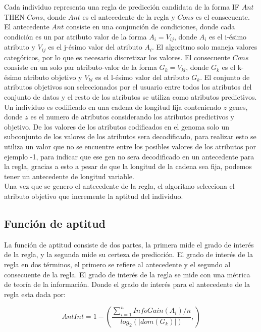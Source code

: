 Cada individuo representa una regla de predicción candidata de la forma IF $Ant$ THEN $Cons$, donde $Ant$ es el antecedente de la regla y $Cons$ es el consecuente. El antecedente $Ant$ consiste en una conjunción de condiciones, donde cada condición es un par atributo valor de la forma $A_i = V_{ij}$, donde $A_i$ es el i-ésimo atributo y $V_{ij}$ es el j-ésimo valor del atributo $A_i$. El algoritmo solo maneja valores categóricos, por lo que es necesario discretizar los valores. El consecuente $Cons$ consiste en un solo par atributo-valor de la forma $G_k = V_{kl}$, donde $G_k$ es el k-ésimo atributo objetivo y $V_{kl}$ es el l-ésimo valor del atributo $G_k$. El conjunto de atributos objetivos son seleccionados por el usuario entre todos los atributos del conjunto de datos y el resto de los atributos se utiliza como atributos predictivos.
\\
Un individuo es codificado en una cadena de longitud fija conteniendo $z$ genes, donde $z$ es el numero de atributos considerando los atributos predictivos y objetivo. De los valores de los atributos codificados en el genoma solo un subconjunto de los valores de los atributos sera decodificado, para realizar esto se utiliza un valor que no se encuentre entre los posibles valores de los atributos por ejemplo -1, para indicar que ese gen no sera decodificado en un antecedente para la regla, gracias a esto a pesar de que la longitud de la cadena sea fija, podemos tener un antecedente de longitud variable.
\\
Una vez que se genero el antecedente de la regla, el algoritmo selecciona el atributo objetivo que incremente la aptitud del individuo.

\subsection{Función de aptitud}

La función de aptitud consiste de dos partes, la primera mide el grado de interés de la regla, y la segunda mide su certeza de predicción. El grado de interés de la regla en dos términos, el primero se refiere al antecedente y el segundo al consecuente de la regla.
El grado de interés de la regla se mide con una métrica de teoría de la información. Donde el grado de interés para el antecedente de la regla esta dada por:

\begin{equation} 
\label{eq:1}
AntInt = 1- \left( \frac{\sum\limits_{i=1}^n InfoGain(A_i)/n}
{log_2(\left| dom(G_k) \right|)},
\right)
\end{equation}

